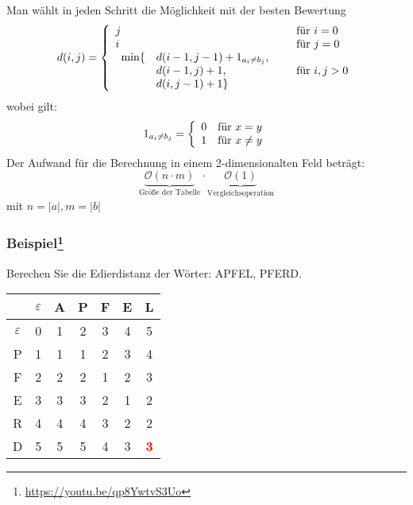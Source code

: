 Man wählt in jeden Schritt die Möglichkeit mit der besten Bewertung
\begin{equation*}
d(i,j) = \left\{
	\begin{array}{l l}
		j & \quad \text{für } i=0\\
		i & \quad \text{für } j=0\\
		\begin{array}{l l}
			\min \{&d(i-1,j-1) + 1_{a_{i} \neq b_{j}},\\
			&d(i-1,j) + 1,\\
			&d(i,j-1) + 1 \}
		\end{array} & \quad \text{für } i,j >0
  \end{array} \right.
\end{equation*}
wobei gilt:
\begin{equation*}
	  1_{a_{i} \neq b_{j}} = \left\{
	\begin{array}{l l}
		0 & \text{für } x = y \\
		1 & \text{für } x \neq y
	\end{array}
	\right.
\end{equation*}
Der Aufwand für die Berechnung in einem 2-dimensionalten Feld beträgt:
\begin{equation*}
	\underbrace{\mathcal{O}(n \cdot m)}_{\textrm{Größe der Tabelle}} \cdot \underbrace{\mathcal{O}(1)}_{\textrm{Vergleichsoperation}}
\end{equation*}
mit \(n = |a|, m= |b|\)

\subsubsection{Beispiel\protect\footnote{\url{https://youtu.be/qp8YwtvS3Uo}}}
Berechen Sie die Edierdistanz der Wörter: APFEL, PFERD.
\begin{center}
	\begin{tabular}{c|cccccc}
		& \(\varepsilon\) & A & P & F & E & L \\ \hline
	\(\varepsilon\)		& 0 & 1 & 2 & 3 & 4 & 5 \\
	P	& 1 & 1 & 1 & 2 & 3 & 4 \\
	F	& 2 & 2 & 2 & 1 & 2 & 3 \\
	E	& 3 & 3 & 3 & 2 & 1 & 2 \\
	R	& 4 & 4 & 4 & 3 & 2 & 2 \\
	D	& 5 & 5 & 5 & 4 & 3 & \textbf{\textcolor{red}{3}}
	\end{tabular}
\end{center}

